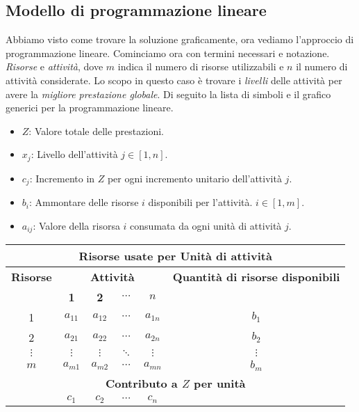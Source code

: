 \documentclass{article}
\begin{document}
  \subsection{Modello di programmazione lineare}
    Abbiamo visto come trovare la soluzione graficamente, ora vediamo l'approccio di programmazione lineare. Cominciamo ora con termini necessari e notazione. \textit{Risorse} e \textit{attività}, dove $m$ indica il numero di risorse utilizzabili e $n$ il numero di attività considerate. Lo scopo in questo caso è trovare i \textit{livelli} delle attività per avere la \textit{migliore prestazione globale}. Di seguito la lista di simboli e il grafico generici per la programmazione lineare.
    \begin{itemize}
      \item $Z$: Valore totale delle prestazioni.
      \item $x_j$: Livello dell'attività $j\in[1,n]$.
      \item $c_j$: Incremento in $Z$ per ogni incremento unitario dell'attività $j$.
      \item $b_i$: Ammontare delle risorse $i$ disponibili per l'attività. $i\in[1,m]$.
      \item $a_{ij}$: Valore della risorsa $i$ consumata da ogni unità di attività $j$.
    \end{itemize}
    
    \begin{table}[ht]
      \centering
      \begin{tabular}{|c|c|c|c|c|c|}
        \hline
        \multicolumn{6}{|c|}{\textbf{Risorse usate per Unità di attività}} \\
        \hline
        \textbf{Risorse} & \multicolumn{4}{|c|}{\textbf{Attività}} & \textbf{Quantità di risorse disponibili} \\
        \cline{2-5}
         & \textbf{1} & \textbf{2} & \textbf{$\cdots$} & \textbf{$n$} &  \\
        \hline
        1 & $a_{11}$ & $a_{12}$ & $\cdots$ & $a_{1n}$ & $b_1$ \\
        2 & $a_{21}$ & $a_{22}$ & $\cdots$ & $a_{2n}$ & $b_2$ \\
        $\vdots$ & $\vdots$ & $\vdots$ & $\ddots$ & $\vdots$ & $\vdots$ \\
        $m$ & $a_{m1}$ & $a_{m2}$ & $\cdots$ & $a_{mn}$ & $b_m$ \\
        \hline
        \multicolumn{6}{|c|}{\textbf{Contributo a $Z$ per unità}} \\
        \hline
        \multicolumn{1}{|c|}{} & $c_1$ & $c_2$ & $\cdots$ & $c_n$ & \\
        \hline
      \end{tabular}
    \end{table} 
\end{document}
